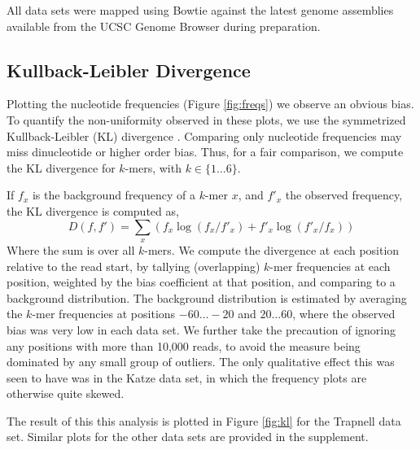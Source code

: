 \documentclass{bioinfo}
\begin{document}
All data sets were mapped using Bowtie \cite{Langmead2009} against the latest
genome assemblies available from the UCSC Genome Browser \cite{Karolchik2008}
during preparation.



\subsection{Kullback-Leibler Divergence}

Plotting the nucleotide frequencies (Figure  \ref{fig:freqs}) we observe an
obvious bias. To quantify the non-uniformity observed in these plots, we use the
symmetrized Kullback-Leibler (KL) divergence \cite{Kullback1951}. Comparing only
nucleotide frequencies may miss dinucleotide or higher order bias. Thus, for a fair
comparison, we compute the KL divergence for $k$-mers, with $k \in \{ 1 \dots 6
\}$.

If $f_x$ is the background frequency of a $k$-mer $x$, and $f'_x$ the observed
frequency, the KL divergence is computed as,
$$D( f, f' ) = \sum_{x} \left( f_x \log( f_x / f'_x ) + f'_x \log( f'_x / f_x) \right)$$
Where the sum is over all $k$-mers. We compute the divergence at each
position relative to the read start, by tallying (overlapping) $k$-mer
frequencies at each position, weighted by the bias coefficient at that position,
and comparing to a background distribution. The background distribution is
estimated by averaging the $k$-mer frequencies at positions $-60 \dots -20$ and
$20 \dots 60$, where the observed bias was very low in each data set.  We further
take the precaution of ignoring any positions with more than 10,000 reads, to
avoid the measure being dominated by any small group of outliers. The only
qualitative effect this was seen to have was in the Katze data set, in which the
frequency plots are otherwise quite skewed.

The result of this this analysis is plotted in Figure
\ref{fig:kl} for the Trapnell data set. Similar plots for the other data sets are
provided in the supplement.

\begin{comment}
\begin{figurehere}
\begin{center}
\texttt{[image: fig/kl.pdf]}
\end{center}
\caption{Plots of the KL divergence over overlapping $k$-mers in the Trapnell
experiment.}
\label{fig:kl}
\end{figurehere}
\end{comment}
\end{document}
